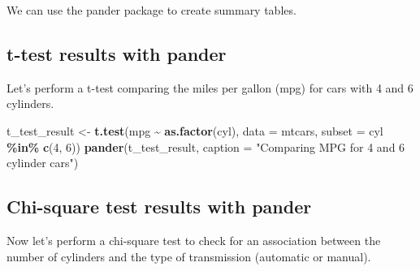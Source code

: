 \documentclass[
]{book}
\newenvironment{Shaded}{\begin{snugshade}}{\end{snugshade}}
\newcommand{\AttributeTok}[1]{\textcolor[rgb]{0.13,0.29,0.53}{#1}}
\newcommand{\CommentTok}[1]{\textcolor[rgb]{0.56,0.35,0.01}{\textit{#1}}}
\newcommand{\DecValTok}[1]{\textcolor[rgb]{0.00,0.00,0.81}{#1}}
\newcommand{\FunctionTok}[1]{\textcolor[rgb]{0.13,0.29,0.53}{\textbf{#1}}}
\newcommand{\NormalTok}[1]{#1}
\newcommand{\OtherTok}[1]{\textcolor[rgb]{0.56,0.35,0.01}{#1}}
\newcommand{\SpecialCharTok}[1]{\textcolor[rgb]{0.81,0.36,0.00}{\textbf{#1}}}
\newcommand{\StringTok}[1]{\textcolor[rgb]{0.31,0.60,0.02}{#1}}
\begin{document}
We can use the pander package to create summary tables.

\begin{Shaded}
\end{Shaded}

\hypertarget{t-test-results-with-pander}{%
\subsection{t-test results with pander}\label{t-test-results-with-pander}}

Let's perform a t-test comparing the miles per gallon (mpg) for cars with 4 and 6 cylinders.

\begin{Shaded}
\begin{Highlighting}[]
\NormalTok{t\_test\_result }\OtherTok{\textless{}{-}} \FunctionTok{t.test}\NormalTok{(mpg }\SpecialCharTok{\textasciitilde{}} \FunctionTok{as.factor}\NormalTok{(cyl), }\AttributeTok{data =}\NormalTok{ mtcars, }\AttributeTok{subset =}\NormalTok{ cyl }\SpecialCharTok{\%in\%} \FunctionTok{c}\NormalTok{(}\DecValTok{4}\NormalTok{, }\DecValTok{6}\NormalTok{))}
\FunctionTok{pander}\NormalTok{(t\_test\_result, }\AttributeTok{caption =} \StringTok{"Comparing MPG for 4 and 6 cylinder cars"}\NormalTok{)}
\end{Highlighting}
\end{Shaded}

\hypertarget{chi-square-test-results-with-pander}{%
\subsection{Chi-square test results with pander}\label{chi-square-test-results-with-pander}}

Now let's perform a chi-square test to check for an association between the number of cylinders and the type of transmission (automatic or manual).

\begin{Shaded}
\end{Shaded}
\end{document}

